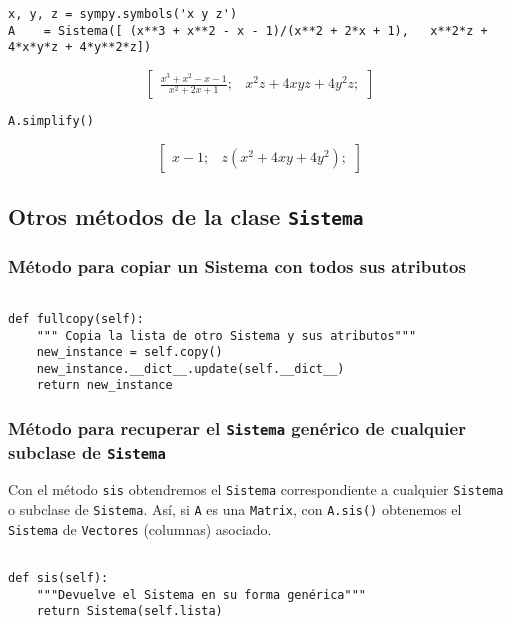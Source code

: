 \documentclass[11pt]{report}
\begin{document}
\begin{verbatim}
x, y, z = sympy.symbols('x y z')
A    = Sistema([ (x**3 + x**2 - x - 1)/(x**2 + 2*x + 1),   x**2*z + 4*x*y*z + 4*y**2*z])
\end{verbatim}

$$\left[ \begin{array}{cc}\frac{x^{3} + x^{2} - x - 1}{x^{2} + 2 x + 1};& x^{2} z + 4 x y z + 4 y^{2} z;\end{array} \right]$$

\begin{verbatim}
A.simplify()
\end{verbatim}

$$\left[ \begin{array}{cc}x - 1;& z \left(x^{2} + 4 x y + 4 y^{2}\right);\end{array} \right]$$

\subsection{Otros métodos de la clase \texttt{Sistema}}
\label{sec:org414163d}
\subsubsection{Método para copiar un Sistema con todos sus atributos}
\label{sec:org85c56e1}

\begin{verbatim}

def fullcopy(self):
    """ Copia la lista de otro Sistema y sus atributos"""
    new_instance = self.copy()
    new_instance.__dict__.update(self.__dict__)
    return new_instance

\end{verbatim}

\subsubsection{Método para recuperar el \texttt{Sistema} genérico de cualquier subclase de \texttt{Sistema}}
\label{sec:org709c519}

Con el método \texttt{sis} obtendremos el \texttt{Sistema} correspondiente a
cualquier \texttt{Sistema} o subclase de \texttt{Sistema}. Así, si \texttt{A} es una
\texttt{Matrix}, con \texttt{A.sis()} obtenemos el \texttt{Sistema} de \texttt{Vectores}
(columnas) asociado.
\begin{verbatim}

def sis(self):
    """Devuelve el Sistema en su forma genérica"""
    return Sistema(self.lista)

\end{verbatim}
\end{document}

